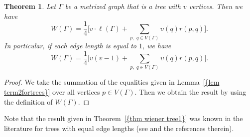\documentclass[12pt]{amsart}
\newtheorem{theorem}{Theorem}[section]
\theoremstyle{example}
\theoremstyle{definition}
\theoremstyle{notation}
\begin{document}
\begin{theorem}\label{thm wiener tree1}
Let ${\Gamma}$ be a metrized graph that is a tree with $v$ vertices. Then we have
$$W({\Gamma})=\frac{1}{4} \Big[ v \cdot {\ell ({\Gamma})} +  \sum_{p, \, \, q \in {V({\Gamma})}} {\upsilon}(q)r(p,q) \Big] .$$
In particular, if each edge length is equal to $1$, we have
$$W({\Gamma})=\frac{1}{4} \Big[ v(v-1)+  \sum_{p, \, \, q \in {V({\Gamma})}} {\upsilon}(q)r(p,q) \Big] .$$
\end{theorem}
\begin{proof}
We take the summation of the equalities given in {Lemma~\ref{{lem term2fortrees}}} over all vertices $p \in {V({\Gamma})}$. Then we obtain the result
by using the definition of $W({\Gamma})$.
\end{proof}
Note that the result given in {Theorem~\ref{{thm wiener tree1}}} was known in the literature for trees with equal edge lengths
(see \cite[page 217]{DEG} and the references therein).
\end{document}
